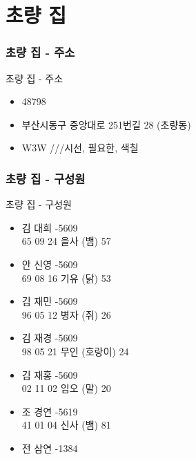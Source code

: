 \documentclass[aspectratio=1610,20pt,xcolor=pdftex,dvipsnames,table,handout]{beamer}
\begin{document}
		\section{초량 집}

		\begin{frame} [t,plain]
		\frametitle{초량 집 - 주소 }
			\begin{block} {초량 집 - 주소 }
			\setlength{\leftmargini}{1em}			
			\begin{itemize}
				\item 	48798
				\item 	부산시동구 중앙대로 251번길 28 (초량동)
				\item 	W3W \hrulefill ///시선, 필요한, 색칠 
			\end{itemize}
			\end{block}			
		\end{frame}						
								

		\begin{frame} [t,plain]
		\frametitle{초량 집 - 구성원 }
			\begin{block} {초량 집 - 구성원}
			\setlength{\leftmargini}{1em}			
			\begin{itemize}
				\item 	김 대희 -5609 \\
						65 09 24 을사 (뱀) 57

				\item 	안 신영 -5609  \\
						69 08 16  기유 (닭) 53

				\item 	김 재민 -5609 \\
						96 05 12 병자 (쥐) 26

				\item 	김 재경 -5609 \\
						98 05 21 무인 (호랑이) 24

				\item 	김 재홍 -5609 \\
						02 11 02 임오 (말) 20

				\item 	조 경연 -5619 \\
						41 01 04 신사 (뱀) 81

				\item 	전 삼연 -1384 \\
			\end{itemize}
			\end{block}			
		\end{frame}						
\end{document}
